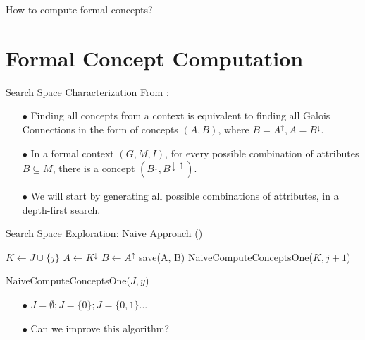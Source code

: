 \documentclass[pdf,xcolor=table]{beamer}
\begin{document}
\begin{frame}[c]
    \huge
    How to compute formal concepts?
\end{frame}

\section[Concept Computation]{Formal Concept Computation}
\begin{frame}[t]{Search Space Characterization}
    From \parencite{Andrews2015}:
    \begin{itemize}
        \item[$\bullet$] Finding all concepts from a context is equivalent to finding all Galois Connections in the form of concepts $(A, B)$, where $B = A^\uparrow, A = B^\downarrow$.
        \item[$\bullet$] In a formal context $(G, M, I)$, for every possible combination of attributes $B \subseteq M$, there is a concept $(B^\downarrow, B^{\downarrow\uparrow})$.
        \item[$\bullet$] We will start by generating all possible combinations of attributes, in a depth-first search.
    \end{itemize}
\end{frame}


\begin{frame}[t]{Search Space Exploration: Naive Approach (\cite{Andrews2015})}
    \begin{algorithm}[H]
        \begin{algorithmic}[1]
            \STATE $K \leftarrow J \cup \{j\}$
            \STATE $A \leftarrow K^\downarrow$
            \STATE $B \leftarrow A^\uparrow$
            \STATE save(A, B)
            \STATE NaiveComputeConceptsOne($K, j + 1$)
            \ENDFOR
        \end{algorithmic}
        \caption{NaiveComputeConceptsOne($J, y$)}
        \label{alg:naive_one}
    \end{algorithm}
    
    \begin{itemize}
        \item[$\bullet$] $J = \emptyset; J = \{0\}; J = \{0, 1\}...$
        \item[$\bullet$] Can we improve this algorithm?
    \end{itemize}
\end{frame}
\end{document}
